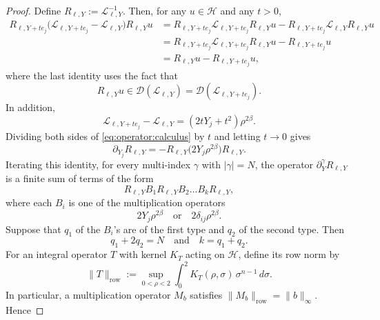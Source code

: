 \documentclass[12pt]{amsart}
\begin{document}
\begin{proof}
Define $R_{\ell,Y}:= \mathcal{L}_{\ell,Y}^{-1}$. Then, for any $u\in \mathcal{H}$ and any $t>0$,
\begin{align}\label{eq:operator:calculus}
    R_{\ell,Y+t e_j}
    \bigl( \mathcal{L}_{\ell, Y+t e_j} - \mathcal{L}_{\ell, Y} \bigr) R_{\ell,Y}u
    &= R_{\ell,Y+t e_j} \mathcal{L}_{\ell, Y+t e_j} R_{\ell,Y}u - R_{\ell,Y+t e_j} \mathcal{L}_{\ell, Y} R_{\ell,Y}u \nonumber\\
    &= R_{\ell,Y+t e_j} \mathcal{L}_{\ell, Y+t e_j} R_{\ell,Y}u - R_{\ell,Y+t e_j}u \nonumber\\
    &= R_{\ell,Y}u - R_{\ell,Y+t e_j}u,
\end{align}
where the last identity uses the fact that
\begin{equation*}
    R_{\ell,Y}u \in \mathcal{D}(\mathcal{L}_{\ell,Y}) = \mathcal{D}(\mathcal{L}_{\ell,Y+te_j}).
\end{equation*}
In addition,
\begin{equation*}
    \mathcal{L}_{\ell, Y+t e_j} - \mathcal{L}_{\ell, Y} = (2t Y_j + t^2) \rho^{2\beta}.
\end{equation*}
Dividing both sides of \eqref{eq:operator:calculus} by $t$ and letting $t \to 0$ gives
\begin{equation*}
    \partial_{Y_j}R_{\ell,Y} = - R_{\ell,Y} \bigl( 2Y_j \rho^{2\beta} \bigr) R_{\ell,Y}.
\end{equation*}
Iterating this identity, for every multi-index $\gamma$ with $|\gamma|=N$, the operator $\partial_{Y}^\gamma R_{\ell,Y}$ is a finite sum of terms of the form
\begin{equation}
    R_{\ell,Y} B_1 R_{\ell,Y} B_2 \dots B_k R_{\ell,Y},
\end{equation}
where each $B_i$ is one of the multiplication operators
\begin{equation*}
    2Y_j \rho^{2\beta} \quad \text{or}\quad 2 \delta_{ij}\rho^{2\beta}.
\end{equation*}
Suppose that $q_1$ of the $B_i$'s are of the first type and $q_2$ of the second type. Then
\begin{equation*}
    q_1+2q_2 = N\quad \text{and}\quad k=q_1+q_2.
\end{equation*}
For an integral operator $T$ with kernel $K_T$ acting on $\mathcal H$, define its row norm by
\begin{equation*}
    \| T \|_{\mathrm{row}}:= \sup_{0<\rho <2} \int_0^2 K_T(\rho,\sigma) \, \sigma^{n-1} \, d\sigma.
\end{equation*}
In particular, a multiplication operator $M_b$ satisfies $\|M_b\|_{\mathrm{row}}=\|b\|_\infty$. Hence

\end{proof}
\end{document}
